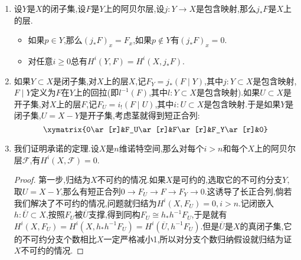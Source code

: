 \begin{enumerate}
\begin{proof}
		首先有向指标集$I$可视为一个范畴.于是$\lim\limits_{\rightarrow}H^i(X,-)$和$H^i(X,\lim\limits_{\rightarrow}-)$都是$\textbf{Sh}(X,\textbf{Ab})^{\mathscr{I}}\to\textbf{Ab}$的函子.它们满足如下四件事保证了它们是自然同构的:
		\begin{itemize}
			\item 如果一个正向系统由松弛层构成,就称为松弛系统.我们断言对任意正向系统$\{F_i\}$,都可以单嵌入到一个松弛系统中.这是因为我们之前构造的Godement预解中的单射$F\to G^0F$是自然变换,所以$\{G^0F_i\}$就是期望的松弛系统.
			\item $\lim\limits_{\rightarrow}H^i(X,-)$和$H^i(X,\lim\limits_{\rightarrow}-)$都是上同调函子.这是因为$I$是有向范畴的时候,正向极限函子是正合函子.
			\item $n=0$的时候有自然同构$\lim\limits_{\rightarrow}\Gamma(X,-)\cong\Gamma(X,\lim\limits_{\rightarrow}-)$.而这是因为诺特空间上阿贝尔层在预层范畴中的正向极限已经就是层,而截面函子$\Gamma$本身就是预层范畴上的正合函子.
			\item 最后要验证对松弛系统$\{F_i\}$都有当$i\ge1$时$\lim\limits_{\rightarrow}H^i(X,F_i)=H^i(X,\lim\limits_{\rightarrow}F_i)=0$.而这是因为我们解释了诺特空间上松弛系统的正向极限也是松弛的.
		\end{itemize}
	\end{proof}
	\item 设$Y$是$X$的闭子集,设$F$是$Y$上的阿贝尔层,设$j:Y\to X$是包含映射,那么$j_*F$是$X$上的层.
	\begin{itemize}
		\item 如果$p\in Y$,那么$(j_*F)_x=F_x$,如果$p\not\in Y$有$(j_*F)_x=0$.
		\item 对任意$i\ge0$总有$H^i(Y,F)=H^i(X,j_*F)$.
	\end{itemize}
	\item 如果$Y\subset X$是闭子集,对$X$上的层$X$,记$F_Y=j_*(F\mid Y)$,其中$j:Y\subset X$是包含映射,$F\mid Y$定义为$F$在$Y$上的回拉(即$l^{-1}(F)$,其中$l:Y\subset X$是包含映射).如果$U\subset X$是开子集,对$X$上的层$F$,记$F_U=i_!(F\mid U)$,其中$i:U\subset X$是包含映射.于是如果$Y$是闭子集,$U=X-Y$是开子集,考虑茎就得到短正合列:
	$$\xymatrix{0\ar[r]&F_U\ar[r]&F\ar[r]&F_Y\ar[r]&0}$$
	\item 我们证明承诺的定理.设$X$是$n$维诺特空间,那么对每个$i>n$和每个$X$上的阿贝尔层$\mathscr{F}$,有$H^i(X,\mathscr{F})=0$.
	\begin{proof}
		
		第一步,归结为$X$不可约的情况.如果$X$是可约的,选取它的不可约分支$Y$,取$U=X-Y$,那么有短正合列$0\to F_U\to F\to F_Y\to0$.这诱导了长正合列,倘若我们解决了不可约的情况,问题就归结为$H^i(X,F_U)=0,i>n$.记闭嵌入$h:\overline{U}\subset X$,按照$F_U$被$\overline{U}$支撑,得到同构$F_U\cong h_*h^{-1}F_U$,于是就有$H^i(X,F_U)=H^i(X,h_*h^{-1}F_U)=H^i(\overline{U},h^{-1}F_U)$.但是$\overline{U}$是$X$的真闭子集,它的不可约分支个数相比$X$一定严格减小1,所以对分支个数归纳假设就归结为证$X$不可约的情况.
		

\end{proof}
\end{enumerate}
